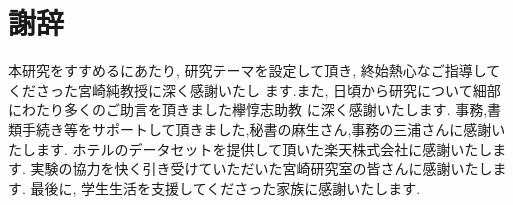 \chapter*{謝辞}
\hspace{1em}本研究をすすめるにあたり, 研究テーマを設定して頂き, 終始熱心なご指導してくださった宮崎純教授に深く感謝いたし
ます.また, 日頃から研究について細部にわたり多くのご助言を頂きました欅惇志助教
に深く感謝いたします.
事務,書類手続き等をサポートして頂きました,秘書の麻生さん,事務の三浦さんに感謝いたします.
ホテルのデータセットを提供して頂いた楽天株式会社に感謝いたします.
実験の協力を快く引き受けていただいた宮崎研究室の皆さんに感謝いたします.
最後に, 学生生活を支援してくださった家族に感謝いたします.
